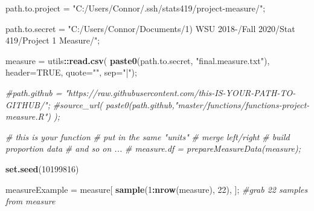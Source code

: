 \documentclass[]{article}
\newenvironment{Shaded}{\begin{snugshade}}{\end{snugshade}}
\newcommand{\CommentTok}[1]{\textcolor[rgb]{0.56,0.35,0.01}{\textit{#1}}}
\newcommand{\DataTypeTok}[1]{\textcolor[rgb]{0.13,0.29,0.53}{#1}}
\newcommand{\DecValTok}[1]{\textcolor[rgb]{0.00,0.00,0.81}{#1}}
\newcommand{\KeywordTok}[1]{\textcolor[rgb]{0.13,0.29,0.53}{\textbf{#1}}}
\newcommand{\NormalTok}[1]{#1}
\newcommand{\OperatorTok}[1]{\textcolor[rgb]{0.81,0.36,0.00}{\textbf{#1}}}
\newcommand{\OtherTok}[1]{\textcolor[rgb]{0.56,0.35,0.01}{#1}}
\newcommand{\StringTok}[1]{\textcolor[rgb]{0.31,0.60,0.02}{#1}}
\begin{document}
\begin{Shaded}
\begin{Highlighting}[]
\NormalTok{path.to.project =}\StringTok{ "C:/Users/Connor/.ssh/stats419/project-measure/"}\NormalTok{;}

\NormalTok{path.to.secret =}\StringTok{ "C:/Users/Connor/Documents/1) WSU 2018-/Fall 2020/Stat 419/Project 1 Measure/"}\NormalTok{;}

\NormalTok{measure =}\StringTok{ }\NormalTok{utils}\OperatorTok{::}\KeywordTok{read.csv}\NormalTok{( }\KeywordTok{paste0}\NormalTok{(path.to.secret, }\StringTok{"final.measure.txt"}\NormalTok{), }\DataTypeTok{header=}\OtherTok{TRUE}\NormalTok{, }\DataTypeTok{quote=}\StringTok{""}\NormalTok{, }\DataTypeTok{sep=}\StringTok{"|"}\NormalTok{);}

\CommentTok{#path.github = "https://raw.githubusercontent.com/this-IS-YOUR-PATH-TO-GITHUB/";}
\CommentTok{#source_url( paste0(path.github,"master/functions/functions-project-measure.R") );}

\CommentTok{# this is your function}
\CommentTok{# put in the same "units"}
\CommentTok{# merge left/right}
\CommentTok{# build proportion data}
\CommentTok{# and so on ... }
\CommentTok{# measure.df = prepareMeasureData(measure);}

\KeywordTok{set.seed}\NormalTok{(}\DecValTok{10199816}\NormalTok{)}

\NormalTok{measureExample =}\StringTok{ }\NormalTok{measure[ }\KeywordTok{sample}\NormalTok{(}\DecValTok{1}\OperatorTok{:}\KeywordTok{nrow}\NormalTok{(measure), }\DecValTok{22}\NormalTok{), ]; }\CommentTok{#grab 22 samples from measure}


\end{Highlighting}
\end{Shaded}
\end{document}

